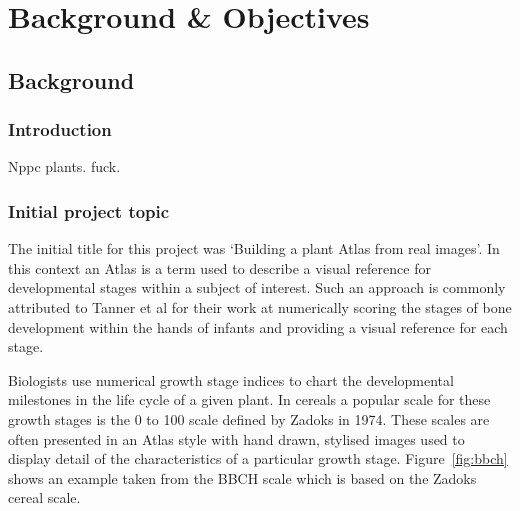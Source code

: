 \chapter{Background \& Objectives}




   
   

\section{Background}
\subsection{Introduction}

Nppc
plants.
fuck.
\subsection{Initial project topic}
The initial title for this project was `Building a plant Atlas from real images'. In this context an Atlas is a term used to describe a visual reference for developmental stages within a subject of interest. Such an approach is commonly attributed to Tanner et al \cite{tanner_assessment_1975} for their work at numerically scoring the stages of bone development within the hands of infants and providing a visual reference for each stage. 

Biologists use numerical growth stage indices to chart the developmental milestones in the life cycle of a given plant. In cereals a popular scale for these growth stages is the 0 to 100 scale defined by Zadoks \cite{zadoks_decimal_1974} in 1974. These scales are often presented in an Atlas style with hand drawn, stylised images used to display detail of the characteristics of a particular growth stage. Figure~\ref{fig:bbch} shows an example taken from the BBCH scale which is based on the Zadoks cereal scale.

